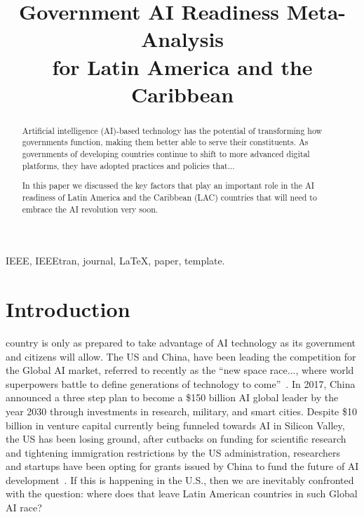 \documentclass[conference]{IEEEtran}
\begin{document}
\title{Government AI Readiness Meta-Analysis\\for Latin America and the Caribbean 
}

\author{
\and
{}
}

\maketitle

\begin{abstract}
Artificial intelligence (AI)-based technology has the potential of transforming how governments function, making them better able to serve their constituents. As governments of developing countries continue to shift to more advanced digital platforms, they have adopted practices and policies that... 

In this paper we discussed the key factors that play an important role in the AI readiness of Latin America and the Caribbean (LAC) countries that will need to embrace the AI revolution very soon.
\end{abstract}

\begin{IEEEkeywords}
IEEE, IEEEtran, journal, \LaTeX, paper, template.
\end{IEEEkeywords}



\section{Introduction}

 country is only as prepared to take advantage of AI technology as its government and citizens will allow. The US and China, have been leading the competition for the Global AI market, referred to recently as the ``new space race..., where world superpowers battle to define generations of technology to come''~\cite{gershgorn2018ai}. In 2017, China announced a three step plan to become a \$150 billion AI global leader by the year 2030 through investments in research, military, and smart cities. Despite \$10 billion in venture capital currently being funneled towards AI in Silicon Valley, the US has been losing ground, after cutbacks on funding for scientific research and tightening immigration restrictions by the US administration, researchers and startups have been opting for grants issued by China to fund the future of AI development~\cite{mozur2017china}. If this is happening in the U.S., then we are inevitably confronted with the question: where does that leave Latin American countries in such Global AI race?
\end{document}
